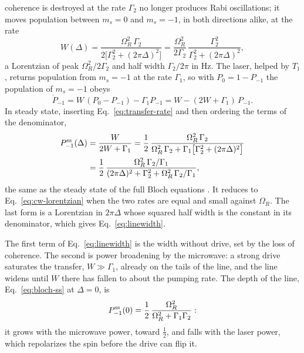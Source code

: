 coherence is destroyed at the rate $\Gamma_2$ no longer produces Rabi oscillations; it moves population between
$m_s=0$ and $m_s=-1$, in both directions alike, at the rate
\begin{equation}
  W(\Delta)=\frac{\Omega_R^2\,\Gamma_2}{2\big[\Gamma_2^2+(2\pi\Delta)^2\big]}
  =\frac{\Omega_R^2}{2\Gamma_2}\,\frac{\Gamma_2^2}{\Gamma_2^2+(2\pi\Delta)^2},
  \label{eq:transfer-rate}
\end{equation}
a Lorentzian of peak $\Omega_R^2/2\Gamma_2$ and half width $\Gamma_2/2\pi$ in Hz. The laser, helped by $T_1$, returns
population from $m_s=-1$ at the rate $\Gamma_1$, so with $P_0=1-P_{-1}$ the population of $m_s=-1$ obeys
\begin{equation*}
  \dot P_{-1}=W\,(P_0-P_{-1})-\Gamma_1P_{-1}=W-(2W+\Gamma_1)\,P_{-1}.
\end{equation*}
In steady state, inserting Eq.~\eqref{eq:transfer-rate} and then ordering the terms of the denominator,
\begin{equation}
  \begin{aligned}
  P_{-1}^{\rm ss}(\Delta)&=\frac{W}{2W+\Gamma_1}
  =\frac12\,\frac{\Omega_R^2\,\Gamma_2}{\Omega_R^2\,\Gamma_2+\Gamma_1\big[\Gamma_2^2+(2\pi\Delta)^2\big]}\\
  &=\frac12\,\frac{\Omega_R^2\,\Gamma_2/\Gamma_1}{(2\pi\Delta)^2+\Gamma_2^2+\Omega_R^2\,\Gamma_2/\Gamma_1},
  \end{aligned}
  \label{eq:bloch-ss}
\end{equation}
the same as the steady state of the full Bloch equations \cite{dreau2011}. It reduces to
Eq.~\eqref{eq:cw-lorentzian} when the two rates are equal and small against $\Omega_R$. The last form is a
Lorentzian in $2\pi\Delta$ whose squared half width is the constant in its denominator, which gives
Eq.~\eqref{eq:linewidth}.

The first term of Eq.~\eqref{eq:linewidth} is the width without drive, set by the loss of coherence. The
second is power broadening by the microwave: a strong drive saturates the transfer, $W\gg\Gamma_1$, already on the
tails of the line, and the line widens until $W$ there has fallen to about the pumping rate. The depth of the line,
Eq.~\eqref{eq:bloch-ss} at $\Delta=0$, is
\begin{equation*}
  P_{-1}^{\rm ss}(0)=\frac12\,\frac{\Omega_R^2}{\Omega_R^2+\Gamma_1\Gamma_2}:
\end{equation*}
it grows with the microwave power, toward $\tfrac12$, and falls with the laser power, which repolarizes the spin
before the drive can flip it.

